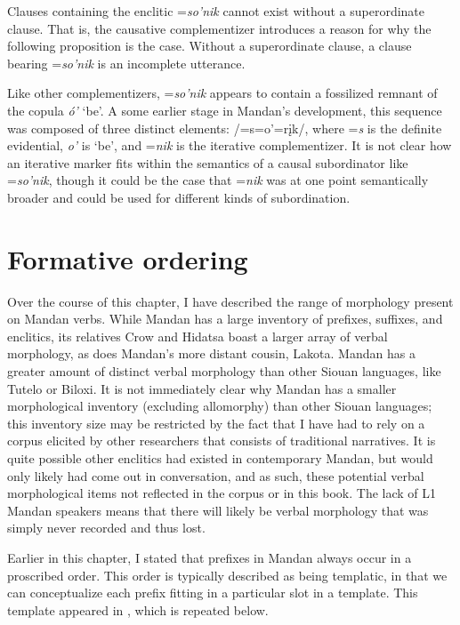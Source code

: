 Clauses containing the enclitic =\textit{so'nik} cannot exist without a superordinate clause. That is, the causative complementizer introduces a reason for why the following proposition is the case. Without a superordinate clause, a clause bearing =\textit{so'nik} is an incomplete utterance.

Like other complementizers, =\textit{so'nik} appears to contain a fossilized remnant of the copula \textit{ó'} `be'. A some earlier stage in Mandan's development, this sequence was composed of three distinct elements: /=s=o'=rįk/, where =\textit{s} is the definite evidential, \textit{o'} is `be', and =\textit{nik} is the iterative complementizer. It is not clear how an iterative marker fits within the semantics of a causal subordinator like =\textit{so'nik}, though it could be the case that =\textit{nik} was at one point semantically broader and could be used for different kinds of subordination.

\section{Formative ordering}\label{SyntaxAffixation}

Over the course of this chapter, I have described the range of morphology present on Mandan verbs. While Mandan has a large inventory of prefixes, suffixes, and enclitics, its relatives Crow and Hidatsa boast a larger array of verbal morphology, as does Mandan's more distant cousin, Lakota. Mandan has a greater amount of distinct verbal morphology than other Siouan languages, like Tutelo or Biloxi. It is not immediately clear why Mandan has a smaller morphological inventory (excluding allomorphy) than other Siouan languages; this inventory size may be restricted by the fact that I have had to rely on a corpus elicited by other researchers that consists of traditional narratives. It is quite possible other enclitics had existed in contemporary Mandan, but would only likely had come out in conversation, and as such, these potential verbal morphological items not reflected in the corpus or in this book. The lack of L1 Mandan speakers means that there will likely be verbal morphology that was simply never recorded and thus lost.

Earlier in this chapter, I stated that prefixes in Mandan always occur in a proscribed order. This order is typically described as being templatic, in that we can conceptualize each prefix fitting in a particular slot in a template. This template appeared in , which is repeated below.


